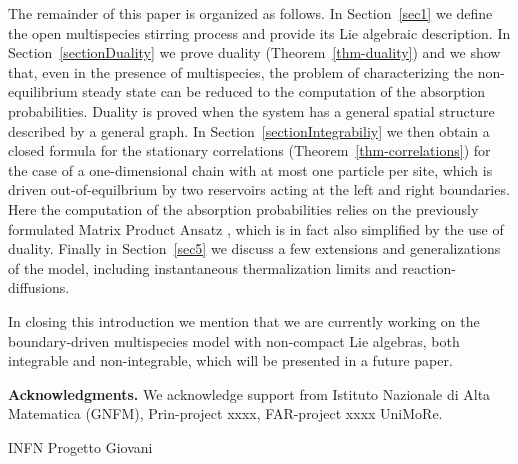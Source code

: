 \documentclass[10pt]{article}
\numberwithin{equation}{section}
\numberwithin{equation}{subsection}
\begin{document}
The remainder of this paper is organized as follows. In Section~\ref{sec1} we define the open multispecies stirring
process and provide its Lie algebraic description. In Section~\ref{sectionDuality} we prove duality (Theorem~\ref{thm-duality}) 
and we show that, even in the presence of multispecies, the problem of characterizing the non-equilibrium 
steady state can be reduced to the computation of the absorption probabilities. Duality is proved when the 
system has a general spatial structure described by a general graph. In Section~\ref{sectionIntegrabiliy} we then obtain a closed formula 
for the stationary correlations (Theorem~\ref{thm-correlations}) for the case of a one-dimensional chain with at most one 
particle per site, which is driven out-of-equilbrium by two reservoirs acting at the left and right boundaries. 
Here the computation of the absorption probabilities relies on the previously formulated Matrix Product Ansatz \cite{vanicat2017exact},
which is in fact also simplified by the use of duality. Finally in Section~\ref{sec5} we discuss a few extensions 
and generalizations of the model, including instantaneous thermalization limits and reaction-diffusions.

In closing this introduction we mention that we are currently working on the boundary-driven multispecies 
model with non-compact Lie algebras, both integrable and non-integrable, which will be presented in a 
future paper. 


{\bf Acknowledgments.} We acknowledge support from Istituto Nazionale di Alta Matematica (GNFM), Prin-project {\color{blue} xxxx}, FAR-project {\color{blue} xxxx} UniMoRe.

INFN Progetto Giovani
\end{document}
